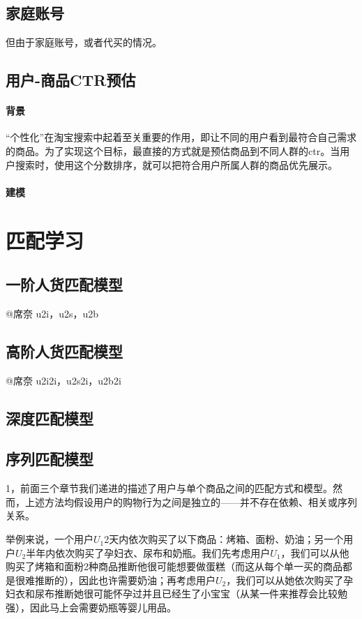 	\subsection{家庭账号}
	但由于家庭账号，或者代买的情况。
	\subsection{用户-商品CTR预估}
	\paragraph{背景}
	“个性化”在淘宝搜索中起着至关重要的作用，即让不同的用户看到最符合自己需求的商品。为了实现这个目标，最直接的方式就是预估商品到不同人群的ctr。当用户搜索时，使用这个分数排序，就可以把符合用户所属人群的商品优先展示。
	\paragraph{建模}
	

\section{匹配学习}
	
	
\subsection{一阶人货匹配模型} 
	@席奈 u2i，u2s，u2b 

\subsection{高阶人货匹配模型} 
	@席奈 u2i2i，u2s2i，u2b2i 

\subsection{深度匹配模型} 

\subsection{序列匹配模型} 
1，前面三个章节我们递进的描述了用户与单个商品之间的匹配方式和模型。然而，上述方法均假设用户的购物行为之间是独立的——并不存在依赖、相关或序列关系。

举例来说，一个用户$U_1$2天内依次购买了以下商品：烤箱、面粉、奶油；另一个用户$U_2$半年内依次购买了孕妇衣、尿布和奶瓶。我们先考虑用户$U_1$，我们可以从他购买了烤箱和面粉2种商品推断他很可能想要做蛋糕（而这从每个单一买的商品都是很难推断的），因此也许需要奶油；再考虑用户$U_2$，我们可以从她依次购买了孕妇衣和尿布推断她很可能怀孕过并且已经生了小宝宝（从某一件来推荐会比较勉强），因此马上会需要奶瓶等婴儿用品。

